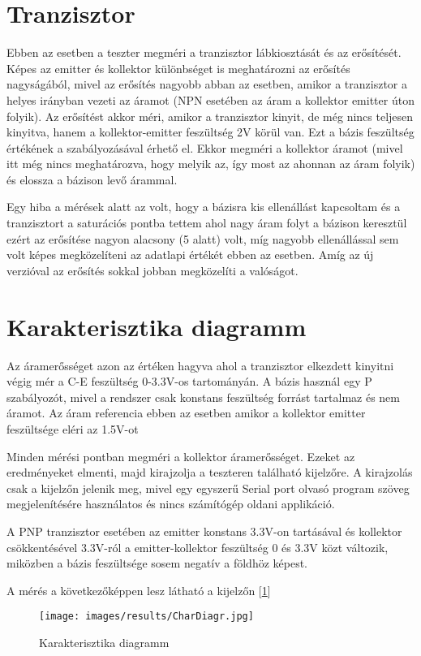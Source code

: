 \section{Tranzisztor}

Ebben az esetben a teszter megméri a tranzisztor lábkiosztását és az erősítését.
Képes az emitter és kollektor különbséget is meghatározni az erősítés nagyságából,
mivel az erősítés nagyobb abban az esetben, amikor a tranzisztor a helyes irányban
vezeti az áramot (NPN esetében az áram a kollektor emitter úton folyik).
Az erősítést akkor méri, amikor a tranzisztor kinyit, de még nincs teljesen kinyitva,
hanem a kollektor-emitter feszültség 2V körül van. Ezt a bázis feszültség
értékének a szabályozásával érhető el. Ekkor megméri a kollektor áramot
(mivel itt még nincs meghatározva, hogy melyik az, így most az ahonnan
az áram folyik) és elossza a bázison levő árammal.

Egy hiba a mérések alatt az volt, hogy a bázisra kis ellenállást
kapcsoltam és a tranzisztort a saturációs pontba tettem ahol 
nagy áram folyt a bázison keresztül ezért az erősítése nagyon alacsony
(5 alatt) volt, míg nagyobb ellenállással sem volt képes megközelíteni
az adatlapi értékét ebben az esetben. Amíg az új verzióval az 
erősítés sokkal jobban megközelíti a valóságot.

\section{Karakterisztika diagramm}

Az áramerősséget azon az értéken hagyva ahol a tranzisztor elkezdett kinyitni
végig mér a C-E feszültség 0-3.3V-os tartományán. A bázis használ egy 
P szabályozót, mivel a rendszer csak konstans feszültség forrást tartalmaz
és nem áramot. Az áram referencia ebben az esetben amikor a kollektor
emitter feszültsége eléri az 1.5V-ot

Minden mérési pontban megméri a kollektor
áramerősséget. Ezeket az eredményeket elmenti, majd kirajzolja a 
teszteren található kijelzőre. A kirajzolás csak a kijelzőn
jelenik meg, mivel egy egyszerű Serial port olvasó program
szöveg megjelenítésére használatos és nincs számítógép oldani applikáció.

A PNP tranzisztor esetében az emitter konstans 3.3V-on tartásával és 
kollektor csökkentésével 3.3V-ról a emitter-kollektor feszültség
0 és 3.3V közt változik, miközben a bázis feszültsége sosem negatív
a földhöz képest.

A mérés a következőképpen lesz látható a kijelzőn [\ref{fig:CharResults}] 

\begin{figure}[H]
    \centering
    \texttt{[image: images/results/CharDiagr.jpg]}
    \caption{Karakterisztika diagramm}
    \label{fig:CharResults}
\end{figure}

